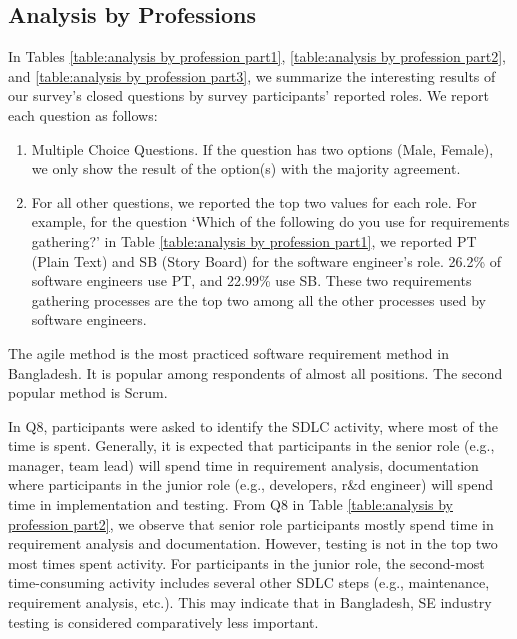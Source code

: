 \subsection{Analysis by Professions}
\label{analyze_by_professions}
In Tables \ref{table:analysis by profession part1}, \ref{table:analysis by profession part2}, and \ref{table:analysis by profession part3}, we summarize the interesting results of our survey's closed questions by survey participants' reported roles. We report each question as follows:

\begin{enumerate}[label=\arabic*)]
  \item Multiple Choice Questions. If the question has two options (Male, Female), we only show the result of the option(s) with the majority agreement.
  \item For all other questions, we reported the top two values for each role. For example, for the question ‘Which of the following do you use for requirements gathering?’ in Table \ref{table:analysis by profession part1}, we reported PT (Plain Text) and SB (Story Board) for the software engineer's role. 26.2\% of software engineers use PT, and 22.99\% use SB. These two requirements gathering processes are the top two among all the other processes used by software engineers.
\end{enumerate}





The agile method is the most practiced software requirement method in Bangladesh. It is popular among respondents of almost all positions. The second popular method is Scrum.

In Q8, participants were asked to identify the SDLC activity, where most of the time is spent. Generally, it is expected that participants in the senior role (e.g., manager, team lead) will spend time in requirement analysis, documentation where participants in the junior role (e.g., developers, r\&d engineer) will spend time in implementation and testing. From Q8 in Table \ref{table:analysis by profession part2}, we observe that senior role participants mostly spend time in requirement analysis and documentation. However, testing is not in the top two most times spent activity. For participants in the junior role, the second-most time-consuming activity includes several other SDLC steps (e.g., maintenance, requirement analysis, etc.). This may indicate that in Bangladesh, SE industry testing is considered comparatively less important.

